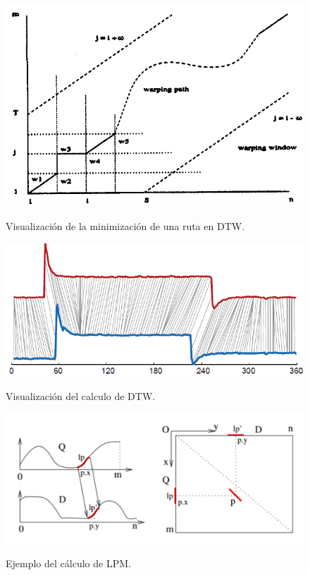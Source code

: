 \begin{figure}[h]
\vspace{0.1in}
\begin{center}
\includegraphics[scale=0.6]{dtw.png}\\
\end{center}
\caption{Visualizaci\'on de la minimizaci\'on de una ruta en DTW.}
\label{arm:fig3}
\end{figure}
\begin{figure}[h]
\vspace{0.1in}
\begin{center}
\includegraphics[scale=0.6]{dtw2.png}\\
\end{center}
\caption{Visualizaci\'on del calculo de DTW.}
\label{arm:fig4}
\end{figure}
\begin{figure}[h]
\vspace{0.1in}
\begin{center}
\includegraphics[scale=0.8]{spade.png}\\
\end{center}
\caption{Ejemplo del c\'alculo de LPM.}
\label{arm:fig5}
\end{figure}
